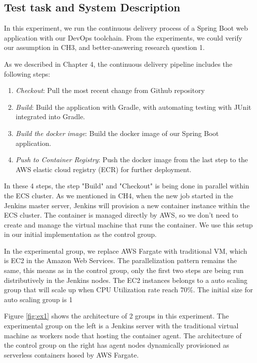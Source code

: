 \subsection{Test task and System Description}
In this experiment, we run the continuous delivery process of a Spring Boot web application with our DevOps toolchain. From the experiments, we could verify our assumption in CH3, and better-answering research question 1.
\par
As we described in Chapter 4, the continuous delivery pipeline includes the following steps:
\begin{enumerate}
    \item \textit{Checkout}: Pull the most recent change from Github repository
    \item \textit{Build}: Build the application with Gradle, with automating testing with JUnit integrated into Gradle.
    \item \textit{Build the docker image}: Build the docker image of our Spring Boot application.
    \item \textit{Push to Container Registry}: Push the docker image from the last step to the AWS elastic cloud registry (ECR) for further deployment.
\end{enumerate}
\par
In these 4 steps, the step "Build" and "Checkout" is being done in parallel within the ECS cluster. As we mentioned in CH4, when the new job started in the Jenkins master server, Jenkins will provision a new container instance within the ECS cluster. The container is managed directly by AWS, so we don't need to create and manage the virtual machine that runs the container. We use this setup in our initial implementation as the control group.
\par
In the experimental group, we replace AWS Fargate with traditional VM, which is EC2 in the Amazon Web Services. The parallelization pattern remains the same, this means as in the control group, only the first two steps are being run distributively in the Jenkins nodes. The EC2 instances belongs to a auto scaling group that will scale up when CPU Utilization rate reach 70\%. The initial size for auto scaling group is 1
\par
Figure \ref{fig:ex1} shows the architecture of 2 groups in this experiment. The experimental group on the left is a Jenkins server with the traditional virtual machine as workers node that hosting the container agent. The architecture of the control group on the right has agent nodes dynamically provisioned as serverless containers hosed by AWS Fargate.
